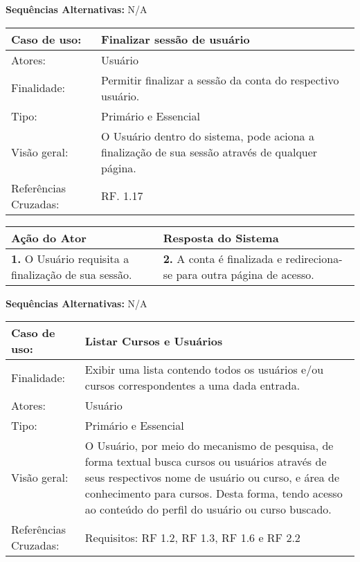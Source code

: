 \documentclass[12pt,a4paper,onecolumn,titlepage]{article}
\begin{document}
\textbf{Sequências Alternativas:} N/A

\newpage

\begin{table}[h!]
\begin{center}
\begin{tabular}{p{2.5cm} p{9.5cm}}
Caso de uso: & \textbf{Finalizar sessão de usuário} \\ \hline
Atores: & Usuário \\ \hline
Finalidade: & Permitir finalizar a sessão da conta do respectivo usuário. \\ \hline
Tipo: & Primário e Essencial \\ \hline
Visão geral: & O Usuário dentro do sistema, pode aciona a finalização de sua sessão através de qualquer página. \\ \hline
Referências Cruzadas: & RF. 1.17

\end{tabular}
\end{center}
\end{table}

\begin{center}
\def\arraystretch{1.1}
\begin{tabular}{|p{6cm}|p{6cm}|}

\hline
\textbf{Ação do Ator} & \textbf{Resposta do Sistema} \\ \hline
\textbf{1.} O Usuário requisita a finalização de sua sessão. & \textbf{2.} A conta é finalizada e redireciona-se para outra página de acesso. \\ \hline
\end{tabular}
\end{center}

\textbf{Sequências Alternativas:} N/A

\newpage


\begin{table}[h!]
\begin{center}
\begin{tabular}{p{2.5cm} p{9.5cm}}
Caso de uso: & \textbf{Listar Cursos e Usuários} \\ \hline
Finalidade: & Exibir uma lista contendo todos os usuários e/ou cursos correspondentes a uma dada entrada.\\ \hline
Atores: & Usuário \\ \hline
Tipo: & Primário e Essencial\\ \hline
Visão geral: & O Usuário, por meio do mecanismo de pesquisa, de forma textual busca cursos ou usuários através de seus respectivos nome de usuário ou curso, e área de conhecimento para cursos. Desta forma, tendo acesso ao conteúdo do perfil do usuário ou curso buscado.\\ \hline
Referências Cruzadas: & Requisitos: RF 1.2, RF 1.3, RF 1.6 e RF 2.2

\end{tabular}
\end{center}
\end{table}
\end{document}
